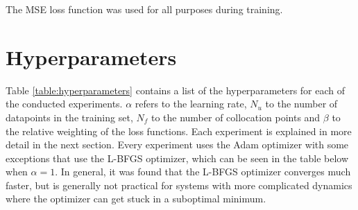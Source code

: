 The MSE loss function was used for all purposes during training.

\section{Hyperparameters}

Table \ref{table:hyperparameters} contains a list of the hyperparameters for each of the conducted experiments. $\alpha$ refers to the learning rate, $N_u$ to the number of datapoints in the training set, $N_f$ to the number of collocation points and $\beta$ to the relative weighting of the loss functions. Each experiment is explained in more detail in the next section. Every experiment uses the Adam optimizer with some exceptions that use the L-BFGS optimizer, which can be seen in the table below when $\alpha = 1$. In general, it was found that the L-BFGS optimizer converges much faster, but is generally not practical for systems with more complicated dynamics where the optimizer can get stuck in a suboptimal minimum.

